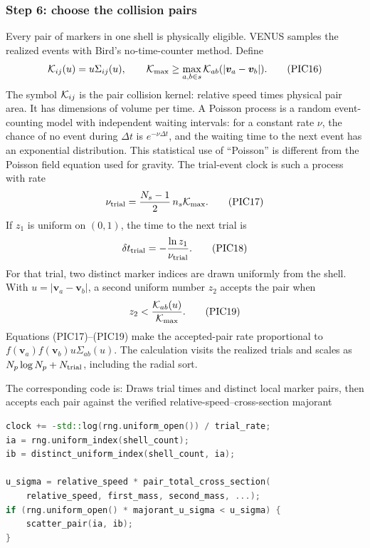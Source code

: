 \subsubsection{Step 6: choose the collision pairs}

Every pair of markers in one shell is physically eligible.  VENUS samples the
realized events with Bird's no-time-counter method.  Define
\[
 {\cal K}_{ij}(u)=u\Sigma_{ij}(u),
 \qquad {\cal K}_{\max}\geq
 \max_{a,b\in s}{\cal K}_{ab}(|\bm v_a-\bm v_b|).       \tag{PIC16}
\]
The symbol \({\cal K}_{ij}\) is the pair collision kernel: relative speed
times physical pair area.  It has dimensions of volume per time.
A Poisson process is a random event-counting model with independent waiting
intervals: for a constant rate \(\nu\), the chance of no event during
\(\Delta t\) is \(e^{-\nu\Delta t}\), and the waiting time to the next event
has an exponential distribution.  This statistical use of ``Poisson'' is
different from the Poisson field equation used for gravity.  The trial-event
clock is such a process with rate
\[
 \nu_{\rm trial}=\frac{N_s-1}{2}\,n_s{\cal K}_{\max}.    \tag{PIC17}
\]
If \(z_1\) is uniform on \((0,1)\), the time to the next trial is
\[
 \delta t_{\rm trial}=-\frac{\ln z_1}{\nu_{\rm trial}}. \tag{PIC18}
\]
For that trial, two distinct marker indices are drawn uniformly from the
shell.  With \(u=|\bm v_a-\bm v_b|\), a second uniform number \(z_2\) accepts
the pair when
\[
 z_2 < \frac{{\cal K}_{ab}(u)}{{\cal K}_{\max}}.         \tag{PIC19}
\]
Equations (PIC17)--(PIC19) make the accepted-pair rate proportional to
\(f(\bm v_a)f(\bm v_b)u\Sigma_{ab}(u)\).  The calculation visits the realized
trials and scales as \(N_p\log N_p+N_{\rm trial}\), including the radial sort.

The corresponding code is:
{}
{Draws trial times and distinct local marker pairs, then accepts each pair
 against the verified relative-speed--cross-section majorant}
\begin{lstlisting}[language=C++]
clock += -std::log(rng.uniform_open()) / trial_rate;
ia = rng.uniform_index(shell_count);
ib = distinct_uniform_index(shell_count, ia);

u_sigma = relative_speed * pair_total_cross_section(
    relative_speed, first_mass, second_mass, ...);
if (rng.uniform_open() * majorant_u_sigma < u_sigma) {
    scatter_pair(ia, ib);
}
\end{lstlisting}

